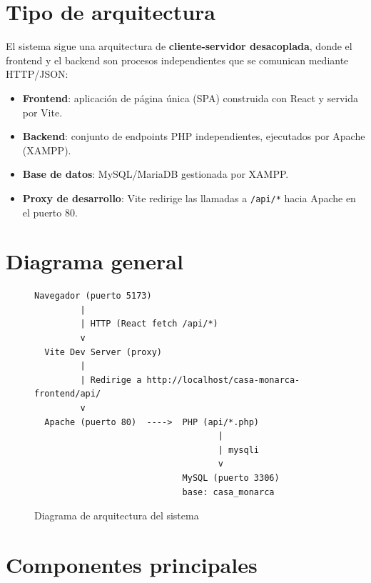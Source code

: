 \documentclass[10pt,letterpaper]{report}
\begin{document}
\section{Tipo de arquitectura}

El sistema sigue una arquitectura de \textbf{cliente-servidor desacoplada}, donde el frontend y el backend son procesos independientes que se comunican mediante HTTP/JSON:

\begin{itemize}
  \item \textbf{Frontend}: aplicación de página única (SPA) construida con React y servida por Vite.
  \item \textbf{Backend}: conjunto de endpoints PHP independientes, ejecutados por Apache (XAMPP).
  \item \textbf{Base de datos}: MySQL/MariaDB gestionada por XAMPP.
  \item \textbf{Proxy de desarrollo}: Vite redirige las llamadas a \texttt{/api/*} hacia Apache en el puerto 80.
\end{itemize}

\section{Diagrama general}

\begin{figure}[H]
\centering
\begin{Verbatim}[frame=single,rulecolor=\color{gray!40},fontsize=\small]
  Navegador (puerto 5173)
         |
         | HTTP (React fetch /api/*)
         v
  Vite Dev Server (proxy)
         |
         | Redirige a http://localhost/casa-monarca-frontend/api/
         v
  Apache (puerto 80)  ---->  PHP (api/*.php)
                                    |
                                    | mysqli
                                    v
                             MySQL (puerto 3306)
                             base: casa_monarca
\end{Verbatim}
\caption{Diagrama de arquitectura del sistema}
\label{fig:arquitectura}
\end{figure}

\section{Componentes principales}
\end{document}
